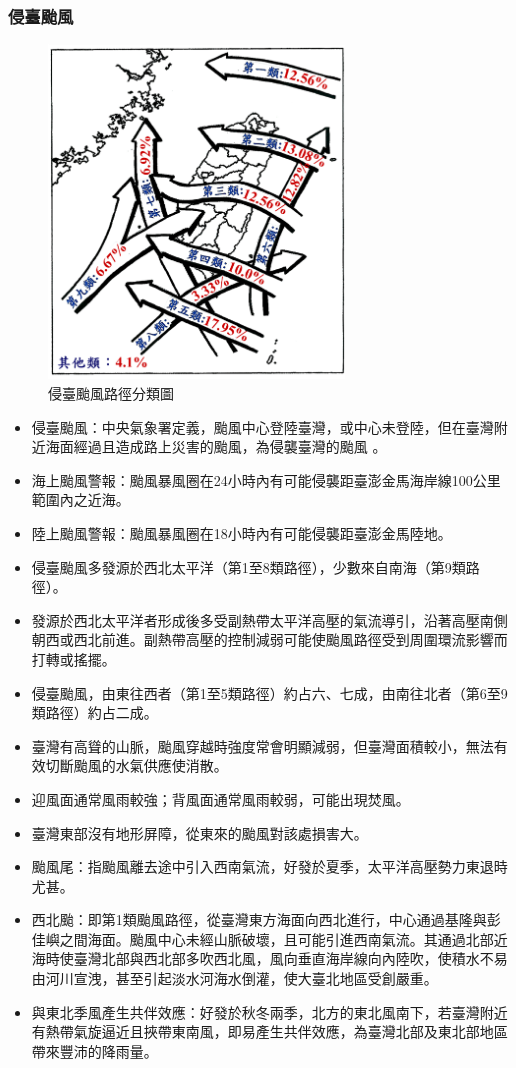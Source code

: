 \documentclass[a4paper,12pt]{report}
\begin{document}
\begin{itemize}
\subsubsection{侵臺颱風}
\bct\begin{figure}[H]
      \centering
      \includegraphics[width=0.7\textwidth]{fig12.png}
      \caption{侵臺颱風路徑分類圖}
  \end{figure}\FB\ect
\begin{itemize}
  \item 侵臺颱風：中央氣象署定義，颱風中心登陸臺灣，或中心未登陸，但在臺灣附近海面經過且造成路上災害的颱風，為侵襲臺灣的颱風 。
  \item 海上颱風警報：颱風暴風圈在24小時內有可能侵襲距臺澎金馬海岸線100公里範圍內之近海。
  \item 陸上颱風警報：颱風暴風圈在18小時內有可能侵襲距臺澎金馬陸地。
  \item 侵臺颱風多發源於西北太平洋（第1至8類路徑），少數來自南海（第9類路徑）。
  \item 發源於西北太平洋者形成後多受副熱帶太平洋高壓的氣流導引，沿著高壓南側朝西或西北前進。副熱帶高壓的控制減弱可能使颱風路徑受到周圍環流影響而打轉或搖擺。
  \item 侵臺颱風，由東往西者（第1至5類路徑）約占六、七成，由南往北者（第6至9類路徑）約占二成。
  \item 臺灣有高聳的山脈，颱風穿越時強度常會明顯減弱，但臺灣面積較小，無法有效切斷颱風的水氣供應使消散。
  \item 迎風面通常風雨較強；背風面通常風雨較弱，可能出現焚風。
  \item 臺灣東部沒有地形屏障，從東來的颱風對該處損害大。
  \item 颱風尾：指颱風離去途中引入西南氣流，好發於夏季，太平洋高壓勢力東退時尤甚。
  \item 西北颱：即第1類颱風路徑，從臺灣東方海面向西北進行，中心通過基隆與彭佳嶼之間海面。颱風中心未經山脈破壞，且可能引進西南氣流。其通過北部近海時使臺灣北部與西北部多吹西北風，風向垂直海岸線向內陸吹，使積水不易由河川宣洩，甚至引起淡水河海水倒灌，使大臺北地區受創嚴重。
  \item 與東北季風產生共伴效應：好發於秋冬兩季，北方的東北風南下，若臺灣附近有熱帶氣旋逼近且挾帶東南風，即易產生共伴效應，為臺灣北部及東北部地區帶來豐沛的降雨量。
\end{itemize}

\end{itemize}
\end{document}
